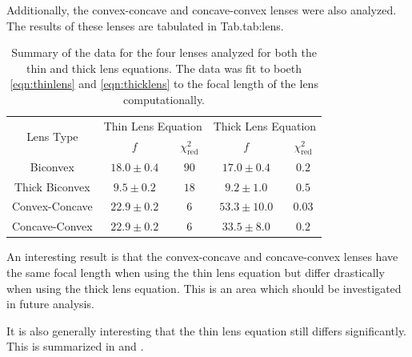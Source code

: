 \documentclass[aip, cp, amsmath, amssymb, reprint, nofootinbib]{revtex4-2}
\begin{document}
            Additionally, the convex-concave and concave-convex lenses were also analyzed. The results of these lenses are tabulated in Tab.{tab:lens}. 

            \begin{table}[H]
                \begin{tabular}{c|c|c|c|c}
                    \hline\hline
                    \multirow{2}{*}{Lens Type} & \multicolumn{2}{c}{Thin Lens Equation} & \multicolumn{2}{c}{Thick Lens Equation} \\
                     & $f$ & $\chi^2_{\text{red}}$ & $f$ &$\chi^2_{\text{red}}$\\
                    \hline
                    Biconvex & $18.0 \pm 0.4$ & $90$ & $17.0 \pm 0.4$ & $0.2$\\
                    Thick Biconvex & $9.5 \pm 0.2$ & $18$ & $9.2 \pm 1.0$ & $0.5$ \\
                    Convex-Concave & $22.9 \pm 0.2$ & $6$ & $53.3 \pm 10.0$ & $0.03$\\
                    Concave-Convex & $22.9 \pm 0.2$ & $6$ & $33.5 \pm 8.0$ & $0.2$\\
                    \hline\hline
                \end{tabular}
                \caption{Summary of the data for the four lenses analyzed for both the thin and thick lens equations. The data was fit to boeth \eqref{eqn:thinlens} and \eqref{eqn:thicklens} to the focal length of the lens computationally.}
                \label{tab:lens}
            \end{table}

            An interesting result is that the convex-concave and concave-convex lenses have the same focal length when using the thin lens equation but differ drastically when using the thick lens equation. This is an area which should be investigated in future analysis.

            It is also generally interesting that the thin lens equation still differs significantly. This is summarized in  and .
\end{document}
